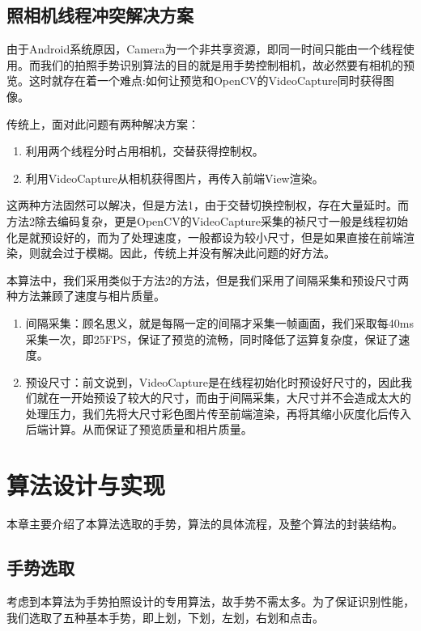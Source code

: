 \documentclass{XDBAthesis}
\begin{document}
\section{照相机线程冲突解决方案}
由于Android系统原因，Camera为一个非共享资源，即同一时间只能由一个线程使用。而我们的拍照手势识别算法的目的就是用手势控制相机，故必然要有相机的预览。这时就存在着一个难点:如何让预览和OpenCV的VideoCapture同时获得图像。

传统上，面对此问题有两种解决方案：
\begin{enumerate}
    \item 利用两个线程分时占用相机，交替获得控制权。
    \item 利用VideoCapture从相机获得图片，再传入前端View渲染。
\end{enumerate}
这两种方法固然可以解决，但是方法1，由于交替切换控制权，存在大量延时。而方法2除去编码复杂，更是OpenCV的VideoCapture采集的祯尺寸一般是线程初始化是就预设好的，而为了处理速度，一般都设为较小尺寸，但是如果直接在前端渲染，则就会过于模糊。因此，传统上并没有解决此问题的好方法。

本算法中，我们采用类似于方法2的方法，但是我们采用了间隔采集和预设尺寸两种方法兼顾了速度与相片质量。
\begin{enumerate}
    \item 间隔采集：顾名思义，就是每隔一定的间隔才采集一帧画面，我们采取每40ms采集一次，即25FPS，保证了预览的流畅，同时降低了运算复杂度，保证了速度。
    \item 预设尺寸：前文说到，VideoCapture是在线程初始化时预设好尺寸的，因此我们就在一开始预设了较大的尺寸，而由于间隔采集，大尺寸并不会造成太大的处理压力，我们先将大尺寸彩色图片传至前端渲染，再将其缩小灰度化后传入后端计算。从而保证了预览质量和相片质量。
\end{enumerate}


\chapter{算法设计与实现}
本章主要介绍了本算法选取的手势，算法的具体流程，及整个算法的封装结构。
\section{手势选取}
考虑到本算法为手势拍照设计的专用算法，故手势不需太多。为了保证识别性能，我们选取了五种基本手势，即上划，下划，左划，右划和点击。
\end{document}

